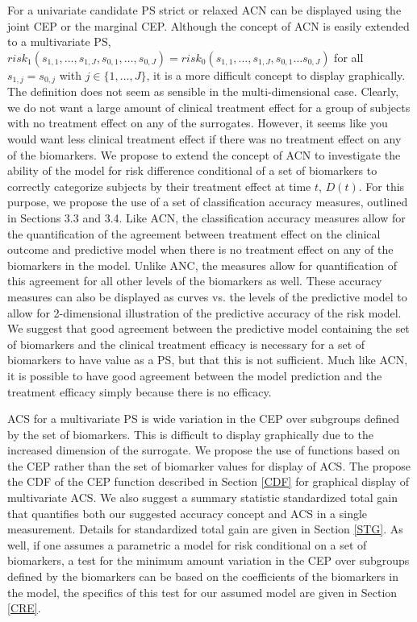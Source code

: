 \documentclass[times, doublespace]{simauth}
\begin{document}
For a univariate candidate PS strict or relaxed ACN can be displayed using the joint CEP or the marginal CEP.  Although the concept of ACN is easily extended to a multivariate PS, $risk_1(s_{1,1}, \dots, s_{1,J} ,s_{0,1}, \dots, s_{0,J})=risk_0(s_{1,1}, \dots, s_{1,J} ,s_{0,1} \dots s_{0,J})$ for all $s_{1,j} = s_{0,j}$ with $j \in \{1, \dots, J\}$, it is a more difficult concept to display graphically. The definition does not seem as sensible in the multi-dimensional case. Clearly, we do not want a large amount of clinical treatment effect for a group of subjects with no treatment effect on any of the surrogates. However, it seems like you would want less clinical treatment effect if there was no treatment effect on any of the biomarkers.  We propose to extend the concept of ACN to investigate the ability of the model for risk difference conditional of a set of biomarkers to correctly categorize subjects by their treatment effect at time $t$, $D(t)$. For this purpose, we propose the use of a set of classification accuracy measures, outlined in Sections 3.3 and 3.4. Like ACN, the classification accuracy measures allow for the quantification of the agreement between treatment effect on the clinical outcome and predictive model when there is no treatment effect on any of the biomarkers in the model.  Unlike ANC, the measures allow for quantification of this agreement for all other levels of the biomarkers as well.  These accuracy measures can also be displayed as curves vs. the levels of the predictive model to allow for 2-dimensional  illustration of the predictive accuracy of the risk model. We suggest that good agreement between the predictive model containing the set of biomarkers and the clinical treatment efficacy is necessary for a set of biomarkers to have value as a PS, but that this is not sufficient. Much like ACN, it is possible to have good agreement between the model prediction and the treatment efficacy simply because there is no efficacy. 

ACS for a multivariate PS is wide variation in the CEP over subgroups defined by the set of biomarkers. This is difficult to display graphically due to the increased dimension of the surrogate. We propose the use of functions based on the CEP rather than the set of biomarker values for display of ACS. The propose the CDF of the CEP function described in Section \ref{CDF} for graphical display of multivariate ACS. We also suggest a summary statistic standardized total gain that quantifies both our suggested accuracy concept and ACS in a single measurement. Details for standardized total gain are given in Section \ref{STG}.  As well, if one assumes a parametric a model for risk conditional on a set of biomarkers, a test for the minimum amount variation in the CEP over subgroups defined by the biomarkers can be based on the coefficients of the biomarkers in the model, the specifics of this test for our assumed model are given in Section \ref{CRE}.
\end{document}

